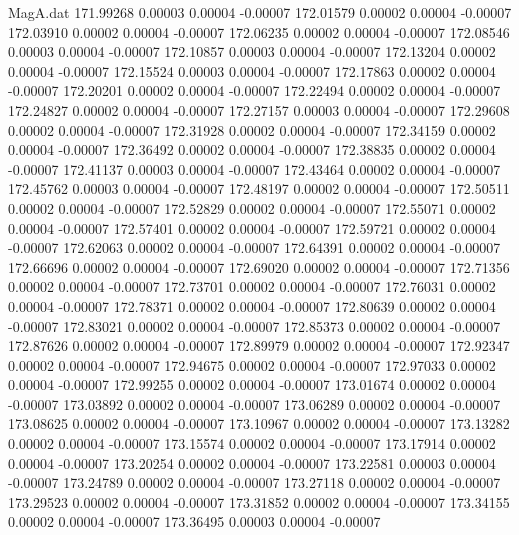 \begin{filecontents}{MagA.dat}
 171.99268    0.00003    0.00004   -0.00007
 172.01579    0.00002    0.00004   -0.00007
 172.03910    0.00002    0.00004   -0.00007
 172.06235    0.00002    0.00004   -0.00007
 172.08546    0.00003    0.00004   -0.00007
 172.10857    0.00003    0.00004   -0.00007
 172.13204    0.00002    0.00004   -0.00007
 172.15524    0.00003    0.00004   -0.00007
 172.17863    0.00002    0.00004   -0.00007
 172.20201    0.00002    0.00004   -0.00007
 172.22494    0.00002    0.00004   -0.00007
 172.24827    0.00002    0.00004   -0.00007
 172.27157    0.00003    0.00004   -0.00007
 172.29608    0.00002    0.00004   -0.00007
 172.31928    0.00002    0.00004   -0.00007
 172.34159    0.00002    0.00004   -0.00007
 172.36492    0.00002    0.00004   -0.00007
 172.38835    0.00002    0.00004   -0.00007
 172.41137    0.00003    0.00004   -0.00007
 172.43464    0.00002    0.00004   -0.00007
 172.45762    0.00003    0.00004   -0.00007
 172.48197    0.00002    0.00004   -0.00007
 172.50511    0.00002    0.00004   -0.00007
 172.52829    0.00002    0.00004   -0.00007
 172.55071    0.00002    0.00004   -0.00007
 172.57401    0.00002    0.00004   -0.00007
 172.59721    0.00002    0.00004   -0.00007
 172.62063    0.00002    0.00004   -0.00007
 172.64391    0.00002    0.00004   -0.00007
 172.66696    0.00002    0.00004   -0.00007
 172.69020    0.00002    0.00004   -0.00007
 172.71356    0.00002    0.00004   -0.00007
 172.73701    0.00002    0.00004   -0.00007
 172.76031    0.00002    0.00004   -0.00007
 172.78371    0.00002    0.00004   -0.00007
 172.80639    0.00002    0.00004   -0.00007
 172.83021    0.00002    0.00004   -0.00007
 172.85373    0.00002    0.00004   -0.00007
 172.87626    0.00002    0.00004   -0.00007
 172.89979    0.00002    0.00004   -0.00007
 172.92347    0.00002    0.00004   -0.00007
 172.94675    0.00002    0.00004   -0.00007
 172.97033    0.00002    0.00004   -0.00007
 172.99255    0.00002    0.00004   -0.00007
 173.01674    0.00002    0.00004   -0.00007
 173.03892    0.00002    0.00004   -0.00007
 173.06289    0.00002    0.00004   -0.00007
 173.08625    0.00002    0.00004   -0.00007
 173.10967    0.00002    0.00004   -0.00007
 173.13282    0.00002    0.00004   -0.00007
 173.15574    0.00002    0.00004   -0.00007
 173.17914    0.00002    0.00004   -0.00007
 173.20254    0.00002    0.00004   -0.00007
 173.22581    0.00003    0.00004   -0.00007
 173.24789    0.00002    0.00004   -0.00007
 173.27118    0.00002    0.00004   -0.00007
 173.29523    0.00002    0.00004   -0.00007
 173.31852    0.00002    0.00004   -0.00007
 173.34155    0.00002    0.00004   -0.00007
 173.36495    0.00003    0.00004   -0.00007

\end{filecontents}
